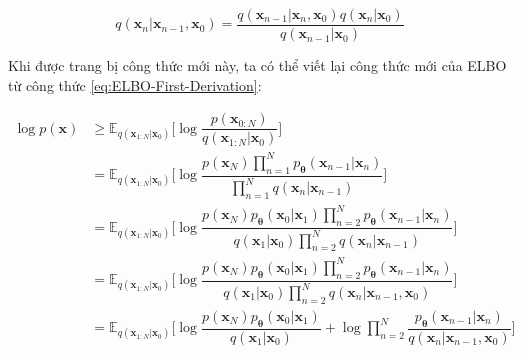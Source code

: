 \documentclass[14pt, a4paper]{article}
\numberwithin{equation}{section}
\numberwithin{figure}{section}
\numberwithin{dl}{section}
\numberwithin{md}{section}
\numberwithin{bd}{section}
\numberwithin{dn}{section}
\numberwithin{hq}{section}
\begin{document}
    \begin{equation}
        q(\boldsymbol{x}_n \vert \boldsymbol{x}_{n-1}, \boldsymbol{x}_0) = \dfrac{q(\boldsymbol{x}_{n-1} \vert \boldsymbol{x}_n, \boldsymbol{x}_0) q(\boldsymbol{x}_n \vert \boldsymbol{x}_0)}{q(\boldsymbol{x}_{n-1} \vert \boldsymbol{x}_0)}
    \end{equation}

    Khi được trang bị công thức mới này, ta có thể viết lại công thức mới của ELBO từ công thức \ref{eq:ELBO-First-Derivation}:

    \begin{equation*} \label{eq:ELBO-Second-Derivation}
        \begin{aligned}
            \log p(\boldsymbol{x}) &\geq \mathbb{E}_{q(\boldsymbol{x}_{1:N} \vert \boldsymbol{x}_0)} \Bigg \lbrack \log \dfrac{p(\boldsymbol{x}_{0:N})}{q(\boldsymbol{x}_{1:N} \vert \boldsymbol{x}_0)} \Bigg \rbrack \\
            &= \mathbb{E}_{q(\boldsymbol{x}_{1:N} \vert \boldsymbol{x}_0)} \Bigg \lbrack \log \dfrac{p(\boldsymbol{x}_N) \prod_{n=1}^N p_{\boldsymbol{\theta}} (\boldsymbol{x}_{n-1} \vert \boldsymbol{x}_n)}{\prod_{n=1}^N q(\boldsymbol{x}_n \vert \boldsymbol{x}_{n-1})} \Bigg \rbrack \\
            &= \mathbb{E}_{q(\boldsymbol{x}_{1:N} \vert \boldsymbol{x}_0)} \Bigg \lbrack \log \dfrac{p(\boldsymbol{x}_N) p_{\boldsymbol{\theta}} (\boldsymbol{x}_0 \vert \boldsymbol{x}_1) \prod_{n=2}^{N} p_{\boldsymbol{\theta}} (\boldsymbol{x}_{n-1} \vert \boldsymbol{x}_n)}{q(\boldsymbol{x}_1 \vert \boldsymbol{x}_0)\prod_{n=2}^N q(\boldsymbol{x}_n \vert \boldsymbol{x}_{n-1})} \Bigg \rbrack \\
            &= \mathbb{E}_{q(\boldsymbol{x}_{1:N} \vert \boldsymbol{x}_0)} \Bigg \lbrack \log \dfrac{p(\boldsymbol{x}_N) p_{\boldsymbol{\theta}} (\boldsymbol{x}_0 \vert \boldsymbol{x}_1) \prod_{n=2}^{N} p_{\boldsymbol{\theta}} (\boldsymbol{x}_{n-1} \vert \boldsymbol{x}_n)}{q(\boldsymbol{x}_1 \vert \boldsymbol{x}_0)\prod_{n=2}^N q(\boldsymbol{x}_n \vert \boldsymbol{x}_{n-1}, \boldsymbol{x}_0)} \Bigg \rbrack \\
            &= \mathbb{E}_{q(\boldsymbol{x}_{1:N} \vert \boldsymbol{x}_0)} \Bigg \lbrack \log \dfrac{p(\boldsymbol{x}_N) p_{\boldsymbol{\theta}} (\boldsymbol{x}_0 \vert \boldsymbol{x}_1)}{q(\boldsymbol{x}_1 \vert \boldsymbol{x}_0)} + \log \prod_{n=2}^N \dfrac{p_{\boldsymbol{\theta}} (\boldsymbol{x}_{n-1} \vert \boldsymbol{x}_n)}{q(\boldsymbol{x}_n \vert \boldsymbol{x}_{n-1}, \boldsymbol{x}_0)} \Bigg \rbrack \\

\end{aligned}
\end{equation*}
\end{document}
